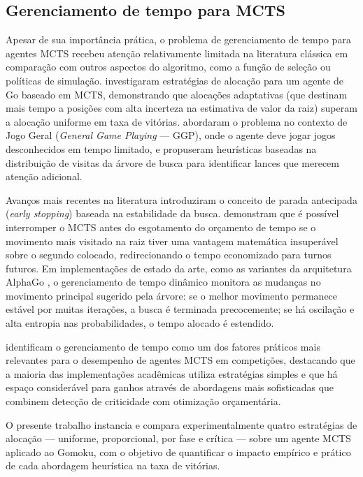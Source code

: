 \documentclass[cic,tc]{iiufrgs}
\begin{document}
\subsection{Gerenciamento de tempo para MCTS}
\label{sec:timemanagement_mcts}

Apesar de sua importância prática, o problema de gerenciamento de tempo para agentes MCTS recebeu atenção relativamente limitada na literatura clássica em comparação com outros aspectos do algoritmo, como a função de seleção ou políticas de simulação. \citet{huang2010time} investigaram estratégias de alocação para um agente de Go baseado em MCTS, demonstrando que alocações adaptativas (que destinam mais tempo a posições com alta incerteza na estimativa de valor da raiz) superam a alocação uniforme em taxa de vitórias. \citet{finnsson2008simulation} abordaram o problema no contexto de Jogo Geral (\emph{General Game Playing} --- GGP), onde o agente deve jogar jogos desconhecidos em tempo limitado, e propuseram heurísticas baseadas na distribuição de visitas da árvore de busca para identificar lances que merecem atenção adicional.

Avanços mais recentes na literatura introduziram o conceito de parada antecipada (\emph{early stopping}) baseada na estabilidade da busca. \citet{baier2014time} demonstram que é possível interromper o MCTS antes do esgotamento do orçamento de tempo se o movimento mais visitado na raiz tiver uma vantagem matemática insuperável sobre o segundo colocado, redirecionando o tempo economizado para turnos futuros. Em implementações de estado da arte, como as variantes da arquitetura AlphaGo \cite{silver2016mastering}, o gerenciamento de tempo dinâmico monitora as mudanças no movimento principal sugerido pela árvore: se o melhor movimento permanece estável por muitas iterações, a busca é terminada precocemente; se há oscilação e alta entropia nas probabilidades, o tempo alocado é estendido.

\citet{browne2012survey} identificam o gerenciamento de tempo como um dos fatores práticos mais relevantes para o desempenho de agentes MCTS em competições, destacando que a maioria das implementações acadêmicas utiliza estratégias simples e que há espaço considerável para ganhos através de abordagens mais sofisticadas que combinem detecção de criticidade com otimização orçamentária.

O presente trabalho instancia e compara experimentalmente quatro estratégias de alocação — uniforme, proporcional, por fase e crítica — sobre um agente MCTS aplicado ao Gomoku, com o objetivo de quantificar o impacto empírico e prático de cada abordagem heurística na taxa de vitórias.
\end{document}
